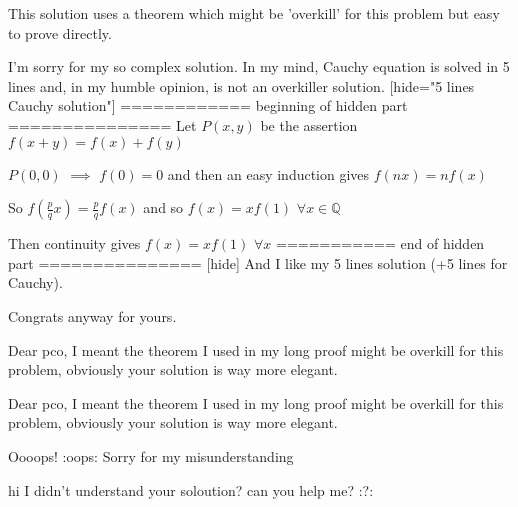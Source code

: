 \begin{solution}
	\begin{tcolorbox}
This solution uses a theorem which might be 'overkill' for this problem but easy to prove directly.
\end{tcolorbox}

I'm sorry for my so complex solution. In my mind, Cauchy equation is solved in 5 lines and, in my humble opinion, is not an overkiller solution.
[hide="5 lines Cauchy solution"]
============ beginning of hidden part ===============
Let $ P(x,y)$ be the assertion $ f(x+y)=f(x)+f(y)$

$ P(0,0)$ $ \implies$ $ f(0)=0$ and then an easy induction gives $ f(nx)=nf(x)$

So $ f(\frac pqx)=\frac pqf(x)$ and so $ f(x)=xf(1)$ $ \forall x\in\mathbb Q$

Then continuity gives $ f(x)=xf(1)$ $ \forall x$
=========== end of hidden part ===============
[\/hide]
And I like my 5 lines solution (+5 lines for Cauchy).

Congrats anyway for yours.
\end{solution}



\begin{solution}
	Dear pco,
I meant the theorem I used in my long proof might be overkill for this problem, obviously your solution is way more elegant.
\end{solution}



\begin{solution}
	\begin{tcolorbox}Dear pco,
I meant the theorem I used in my long proof might be overkill for this problem, obviously your solution is way more elegant.\end{tcolorbox}

Oooops!  :oops:  Sorry for my misunderstanding
\end{solution}



\begin{solution}
	hi
I didn't understand your soloution?
can you help me?
 :?:
\end{solution}



